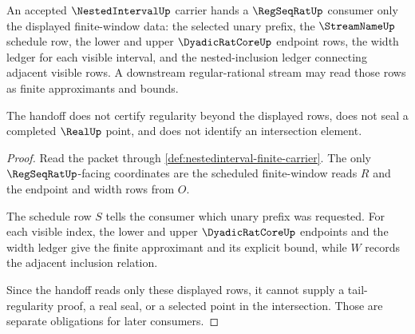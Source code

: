 \begin{theorem}
\label{thm:nestedinterval-regseqrat-handoff}
An accepted $\NestedIntervalUp$ carrier hands a $\RegSeqRatUp$ consumer only the displayed finite-window data: the selected unary prefix, the $\StreamNameUp$ schedule row, the lower and upper $\DyadicRatCoreUp$ endpoint rows, the width ledger for each visible interval, and the nested-inclusion ledger connecting adjacent visible rows. A downstream regular-rational stream may read those rows as finite approximants and bounds.

The handoff does not certify regularity beyond the displayed rows, does not seal a completed $\RealUp$ point, and does not identify an intersection element.
\end{theorem}
\begin{proof}
Read the packet through \autoref{def:nestedinterval-finite-carrier}. The only $\RegSeqRatUp$-facing coordinates are the scheduled finite-window reads $R$ and the endpoint and width rows from $O$.

The schedule row $S$ tells the consumer which unary prefix was requested. For each visible index, the lower and upper $\DyadicRatCoreUp$ endpoints and the width ledger give the finite approximant and its explicit bound, while $W$ records the adjacent inclusion relation.

Since the handoff reads only these displayed rows, it cannot supply a tail-regularity proof, a real seal, or a selected point in the intersection. Those are separate obligations for later consumers.
\end{proof}

